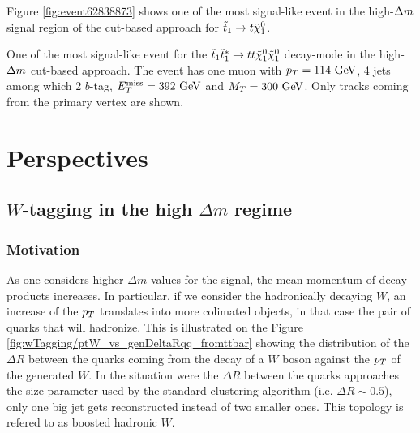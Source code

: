    Figure \ref{fig:event62838873} shows one of the most signal-like event in the
    high-$\Delta m$ signal region of the cut-based approach for $\tilde{t}_1 \rightarrow t \tilde{\chi}_1^0$.

    {One of the most signal-like event for the $\tilde{t}_1 \tilde{t}_1^{*} \rightarrow t t \tilde{\chi}_1^0 \tilde{\chi}_1^0$ decay-mode in the high-$\Delta m$ cut-based approach. The event has one muon with $p_T = 114~\text{GeV}$, 4 jets among which 2 $b$-tag, $E_T^\text{miss} = 392~\text{GeV}$ and $M_T = 300 ~\text{GeV}$. Only tracks coming from the primary vertex are shown.}

    \newpage

    \section{Perspectives \label{sec:analysis_perspective}}

    \subsection{$W$-tagging in the high $\Delta m$ regime}

            \subsubsection{Motivation}

             As one considers higher $\Delta m$ values for the signal, the mean momentum of
             decay products increases. In particular, if we consider the hadronically
             decaying $W$, an increase of the $p_T$ translates into more colimated objects,
             in that case the pair of quarks that will hadronize. This is illustrated on
             the Figure \ref{fig:wTagging/ptW_vs_genDeltaRqq_fromttbar} showing the
             distribution of the $\Delta R$ between the
             quarks coming from the decay of a $W$ boson against the $p_T$ of the generated
             $W$. In the situation were the $\Delta R$ between the quarks approaches the
             size parameter used by the standard clustering algorithm (i.e. $\Delta R
             \sim 0.5$), only one big jet gets reconstructed instead of two smaller ones.
             This topology is refered to as boosted hadronic $W$.


